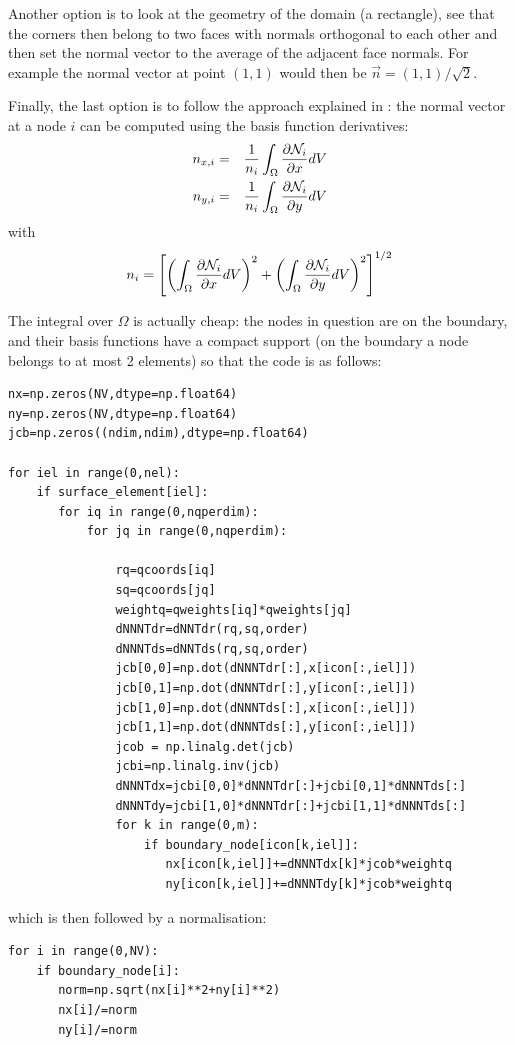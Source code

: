 Another option is to look at the geometry of the domain (a rectangle), see that 
the corners then belong to two faces with normals orthogonal to each other 
and then set the normal vector to the average of the adjacent face normals.
For example the normal vector at point $(1,1)$ would then be $\vec{n}=(1,1)/\sqrt{2}$.

Finally, the last option is to follow the approach 
explained in \textcite{ensg82}: 
the normal vector at a node $i$ can be computed using the basis function derivatives:
\begin{eqnarray}
n_{x,i} &=& \frac{1}{n_i}\int_\Omega \frac{\partial {\mathcal{N}}_i}{\partial x} dV \nonumber\\
n_{y,i} &=& \frac{1}{n_i}\int_\Omega \frac{\partial {\mathcal{N}}_i}{\partial y} dV \nonumber
\end{eqnarray}
with 
\[
n_i = \left[
\left(\int_\Omega \frac{\partial {\mathcal{N}}_i}{\partial x} dV\right)^2 +
\left(\int_\Omega \frac{\partial {\mathcal{N}}_i}{\partial y} dV\right)^2 
\right]^{1/2}
\]

The integral over $\Omega$ is actually cheap: the nodes in question are on the boundary, 
and their basis functions have a compact support (on the boundary a node belongs to at 
most 2 elements) so that the code is as follows:

\begin{lstlisting}
nx=np.zeros(NV,dtype=np.float64) 
ny=np.zeros(NV,dtype=np.float64) 
jcb=np.zeros((ndim,ndim),dtype=np.float64)

for iel in range(0,nel):
    if surface_element[iel]: 
       for iq in range(0,nqperdim):
           for jq in range(0,nqperdim):

               rq=qcoords[iq]
               sq=qcoords[jq]
               weightq=qweights[iq]*qweights[jq]
               dNNNTdr=dNNTdr(rq,sq,order)
               dNNNTds=dNNTds(rq,sq,order)
               jcb[0,0]=np.dot(dNNNTdr[:],x[icon[:,iel]])
               jcb[0,1]=np.dot(dNNNTdr[:],y[icon[:,iel]])
               jcb[1,0]=np.dot(dNNNTds[:],x[icon[:,iel]])
               jcb[1,1]=np.dot(dNNNTds[:],y[icon[:,iel]])
               jcob = np.linalg.det(jcb)
               jcbi=np.linalg.inv(jcb)
               dNNNTdx=jcbi[0,0]*dNNNTdr[:]+jcbi[0,1]*dNNNTds[:]
               dNNNTdy=jcbi[1,0]*dNNNTdr[:]+jcbi[1,1]*dNNNTds[:]
               for k in range(0,m):
                   if boundary_node[icon[k,iel]]:
                      nx[icon[k,iel]]+=dNNNTdx[k]*jcob*weightq
                      ny[icon[k,iel]]+=dNNNTdy[k]*jcob*weightq
\end{lstlisting}
which is then followed by a normalisation:
\begin{lstlisting}
for i in range(0,NV):
    if boundary_node[i]:
       norm=np.sqrt(nx[i]**2+ny[i]**2)
       nx[i]/=norm
       ny[i]/=norm
\end{lstlisting}

